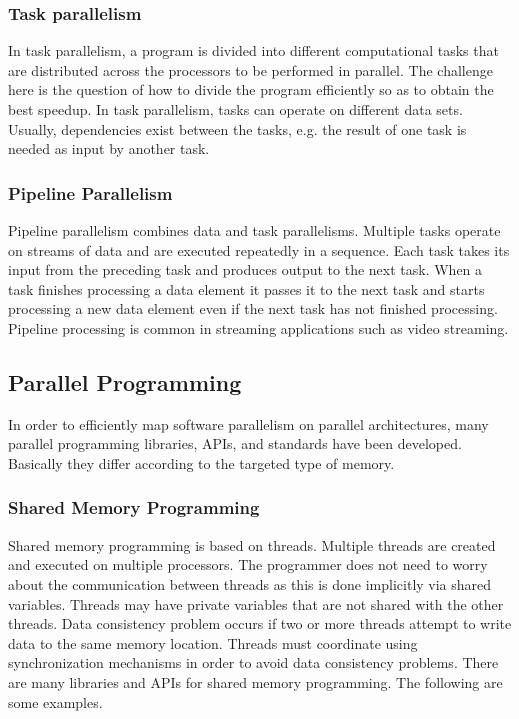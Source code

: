 \subsubsection{Task parallelism}
In task parallelism, a program is divided into different computational tasks that are distributed across the processors to be performed in parallel. The challenge here is the question of how to divide the program efficiently so as to obtain the best speedup. In task parallelism, tasks can operate on different data sets. Usually, dependencies exist between the tasks, e.g. the result of one task is needed as input by another task.

\subsubsection{Pipeline Parallelism}

Pipeline parallelism combines data and task parallelisms. Multiple tasks operate on streams of data and are executed repeatedly in a sequence. Each task takes its input from the preceding task and produces output to the next task. When a task finishes processing a data element it passes it to the next task and starts processing a new data element even if the next task has not finished processing. Pipeline processing is common in streaming applications such as video streaming. 

\subsection{Parallel Programming}

In order to efficiently map software parallelism on parallel architectures, many parallel programming libraries, APIs, and standards have been developed. Basically they differ according to the targeted type of memory.

\subsubsection{Shared Memory Programming}

Shared memory programming is based on threads. Multiple threads are created and executed on multiple processors. The programmer does not need to worry about the communication between threads as this is done implicitly via shared variables. Threads may have private variables that are not shared with the other threads. Data consistency problem occurs if two or more threads attempt to write data to the same memory location. Threads must coordinate using synchronization mechanisms in order to avoid data consistency problems. There are many libraries and APIs for shared memory programming. The following are some examples.

